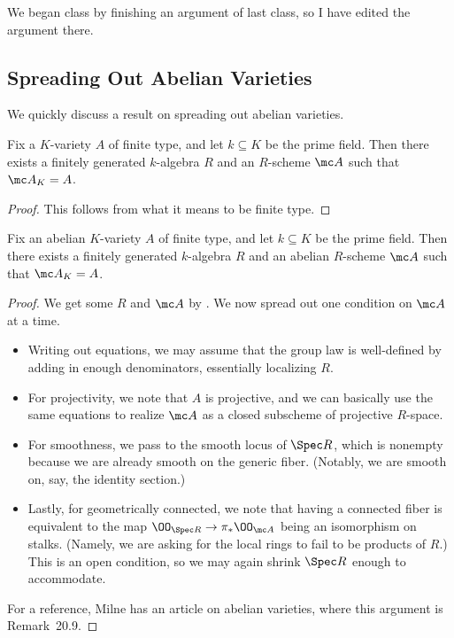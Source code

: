 \documentclass[../notes.tex]{subfiles}
\begin{document}
We began class by finishing an argument of last class, so I have edited the argument there.

\subsection{Spreading Out Abelian Varieties}
We quickly discuss a result on spreading out abelian varieties.
\begin{proposition} \label{prop:spread-out-ft}
	Fix a $K$-variety $A$ of finite type, and let $k\subseteq K$ be the prime field. Then there exists a finitely generated $k$-algebra $R$ and an $R$-scheme $\mc A$ such that $\mc A_K=A$.
\end{proposition}
\begin{proof}
	This follows from what it means to be finite type.
\end{proof}
\begin{proposition} \label{prop:spread-out-av}
	Fix an abelian $K$-variety $A$ of finite type, and let $k\subseteq K$ be the prime field. Then there exists a finitely generated $k$-algebra $R$ and an abelian $R$-scheme $\mc A$ such that $\mc A_K=A$.
\end{proposition}
\begin{proof}
	We get some $R$ and $\mc A$ by . We now spread out one condition on $\mc A$ at a time.
	\begin{itemize}
		\item Writing out equations, we may assume that the group law is well-defined by adding in enough denominators, essentially localizing $R$.
		\item For projectivity, we note that $A$ is projective, and we can basically use the same equations to realize $\mc A$ as a closed subscheme of projective $R$-space.
		\item For smoothness, we pass to the smooth locus of $\Spec R$, which is nonempty because we are already smooth on the generic fiber. (Notably, we are smooth on, say, the identity section.)
		\item Lastly, for geometrically connected, we note that having a connected fiber is equivalent to the map $\OO_{\Spec R}\to\pi_*\OO_{\mc A}$ being an isomorphism on stalks. (Namely, we are asking for the local rings to fail to be products of $R$.) This is an open condition, so we may again shrink $\Spec R$ enough to accommodate.
	\end{itemize}
	For a reference, Milne has an article on abelian varieties, where this argument is Remark~20.9.
\end{proof}
\end{document}
